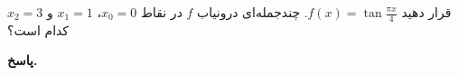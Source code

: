 قرار دهید
\(f(x) = \tan \frac{\pi x}{4}\).
چندجمله‌ای درونیاب
\(f\)
در نقاط
\(x_0=0\)،
\(x_1 =1\)
و
\(x_2 = 3\)
کدام است؟
\vspace*{-.2cm}

\begin{answer}

	\textbf{پاسخ.}
	
\end{answer}
